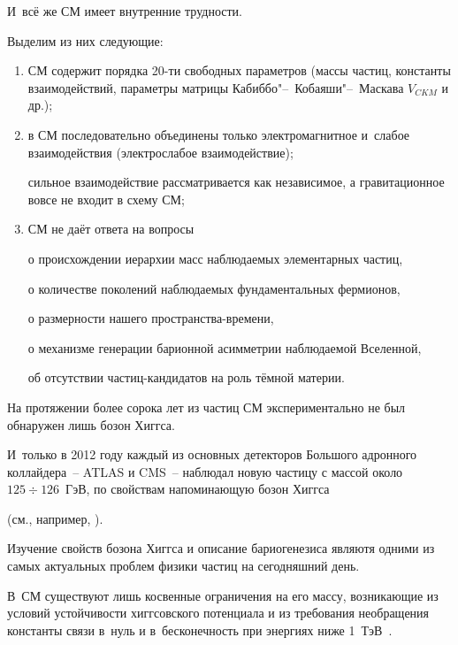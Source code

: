 И~всё же СМ имеет внутренние трудности. 

Выделим из них следующие:

\begin{enumerate}

\item[1)]  СМ содержит порядка 20-ти свободных параметров (массы частиц, константы взаимодействий, параметры матрицы Кабиббо"--~Кобаяши"--~Маскава $V_{ CKM }$ и др.);



\item[2)]   в СМ последовательно объединены только электромагнитное и~слабое взаимодействия (электрослабое взаимодействие);

сильное взаимодействие рассматривается как независимое, а гравитационное вовсе не входит в схему СМ;



\item[3)]  СМ не даёт ответа на вопросы 

о происхождении иерархии масс наблюдаемых элементарных частиц,

о количестве поколений наблюдаемых фундаментальных фермионов,

о размерности нашего пространства-времени,

о механизме генерации барионной асимметрии наблюдаемой Вселенной,

об отсутствии частиц-кандидатов на роль тёмной материи.  



\end{enumerate}







На протяжении более сорока лет из частиц СМ экспериментально не был обнаружен лишь бозон Хиггса. 

И~только в 2012 году каждый из основных детекторов Большого адронного коллайдера~-- ATLAS и CMS~-- наблюдал новую частицу с массой около $125\div126$~ГэВ, по свойствам напоминающую бозон Хиггса 

(см., например, \cite{cms, atlas}). 

Изучение свойств бозона Хиггса и описание бариогенезиса являютя одними из самых актуальных проблем физики частиц на сегодняшний день.



В~СМ существуют лишь косвенные ограничения на его массу, возникающие из условий устойчивости хиггсовского потенциала и из требования необращения константы связи в~нуль и в~бесконечность при энергиях ниже 1~ТэВ~\cite{ech}.




